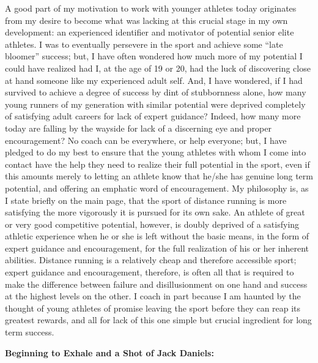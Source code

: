 A good part of my motivation to work with younger athletes today originates from my desire to become what was lacking at this crucial stage in my own development: an experienced identifier and motivator of potential senior elite athletes. I was to eventually persevere in the sport and achieve some “late bloomer” success; but, I have often wondered how much more of my potential I could have realized had I, at the age of 19 or 20, had the luck of discovering close at hand someone like my experienced adult self. And, I have wondered, if I had survived to achieve a degree of success by dint of stubbornness alone, how many young runners of my generation with similar potential were deprived completely of satisfying adult careers for lack of expert guidance? Indeed, how many more today are falling by the wayside for lack of a discerning eye and proper encouragement? No coach can be everywhere, or help everyone; but, I have pledged to do my best to ensure that the young athletes with whom I come into contact have the help they need to realize their full potential in the sport, even if this amounts merely to letting an athlete know that he/she has genuine long term potential, and offering an emphatic word of encouragement. My philosophy is, as I state briefly on the main page, that the sport of distance running is more satisfying the more vigorously it is pursued for its own sake. An athlete of great or very good competitive potential, however, is doubly deprived of a satisfying athletic experience when he or she is left without the basic means, in the form of expert guidance and encouragement, for the full realization of his or her inherent abilities. Distance running is a relatively cheap and therefore accessible sport; expert guidance and encouragement, therefore, is often all that is required to make the difference between failure and disillusionment on one hand and success at the highest levels on the other. I coach in part because I am haunted by the thought of young athletes of promise leaving the sport before they can reap its greatest rewards, and all for lack of this one simple but crucial ingredient for long term success.

\bigskip
\textbf{Beginning to Exhale and a Shot of Jack Daniels:}
\bigskip


